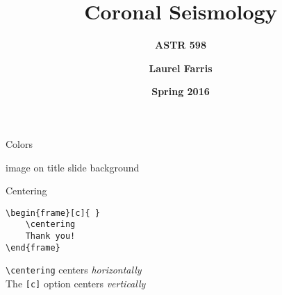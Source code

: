 \documentclass{beamer}
\title{\textbf{Coronal Seismology}}
\subtitle{\textbf{ASTR 598}}
\date{\textbf{Spring 2016}}
\author{\textbf{Laurel Farris}}
\begin{document}
\begin{frame}{Colors}


\end{frame}%
\begin{frame}{image on title slide background}
\end{frame}%
\begin{frame}[fragile=singleslide]{Centering}
    \begin{verbatim}
\begin{frame}[c]{ }
    \centering
    Thank you!
\end{frame}
    \end{verbatim}

    \verb|\centering| centers \emph{horizontally}\\
    The \verb|[c]| option centers \emph{vertically}

\end{frame}%
\end{document}
